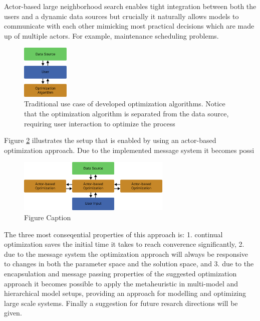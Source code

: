 \documentclass[preprint,12pt,authoryear]{elsarticle}
\begin{document}
Actor-based large neighborhood search enables tight integration between both the users and a 
dynamic data sources but crucially it naturally allows models to communicate with each other mimicking most 
practical decisions which are made up of multiple actors. For example, maintenance scheduling problems.

\begin{figure}[H]%
\centering%
\includegraphics[width=0.2\textwidth]{figures/normal-setup.pdf}
\caption{Traditional use case of developed optimization algorithms. Notice that the optimization algorithm is separated from the data source, requiring user interaction to optimize the process}
\label{fig:normal-setup}
\end{figure}

Figure \ref{fig:actor-setup} illustrates the setup that is enabled by using an actor-based optimization approach. Due to the implemented message system it becomes possi 
\begin{figure}[H]%
\centering%
\includegraphics[width=0.65\textwidth]{figures/actor-setup.pdf}
\caption{Figure Caption}\label{fig:actor-setup}
\end{figure}

The three most conseqential properties of this approach is: 1. continual optimization saves the initial time it takes to reach converence significantly, 2. due to the message system the 
optimization approach will always be responsive to changes in both the parameter space
and the solution space, and 3. due to the encapsulation and message passing properties of the suggested optimization approach it becomes possible to apply the metaheuristic in multi-model 
and hierarchical model setups, providing an
approach for modelling and optimizing large scale systems. Finally a suggestion for future resarch directions will be given.
\end{document}
